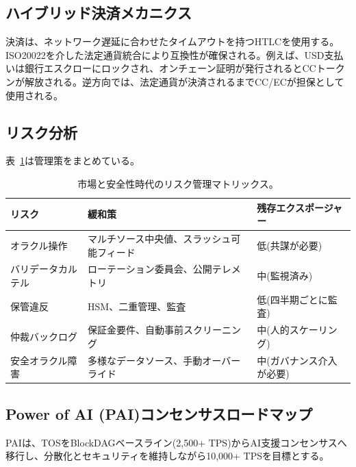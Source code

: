 \documentclass[11pt]{article}
\begin{document}
\subsection{ハイブリッド決済メカニクス}
決済は、ネットワーク遅延に合わせたタイムアウトを持つHTLCを使用する。ISO20022を介した法定通貨統合により互換性が確保される。例えば、USD支払いは銀行エスクローにロックされ、オンチェーン証明が発行されるとCCトークンが解放される。逆方向では、法定通貨が決済されるまでCC/ECが担保として使用される。

\subsection{リスク分析}
表~\ref{tab:risk-markets}は管理策をまとめている。

\begin{table}[H]
  \centering
  \begin{tabular}{p{}p{}p{}}
    \toprule
    \textbf{リスク} & \textbf{緩和策} & \textbf{残存エクスポージャー} \\
    \midrule
    オラクル操作 & マルチソース中央値、スラッシュ可能フィード & 低(共謀が必要) \\
    バリデータカルテル & ローテーション委員会、公開テレメトリ & 中(監視済み) \\
    保管違反 & HSM、二重管理、監査 & 低(四半期ごとに監査) \\
    仲裁バックログ & 保証金要件、自動事前スクリーニング & 中(人的スケーリング) \\
    安全オラクル障害 & 多様なデータソース、手動オーバーライド & 中(ガバナンス介入が必要) \\
    \bottomrule
  \end{tabular}
  \caption{市場と安全性時代のリスク管理マトリックス。}
  \label{tab:risk-markets}
\end{table}

\subsection{Power of AI (PAI)コンセンサスロードマップ}
\label{sec:pai-roadmap}
PAIは、TOSをBlockDAGベースライン(2,500+ TPS)からAI支援コンセンサスへ移行し、分散化とセキュリティを維持しながら10,000+ TPSを目標とする。
\end{document}

